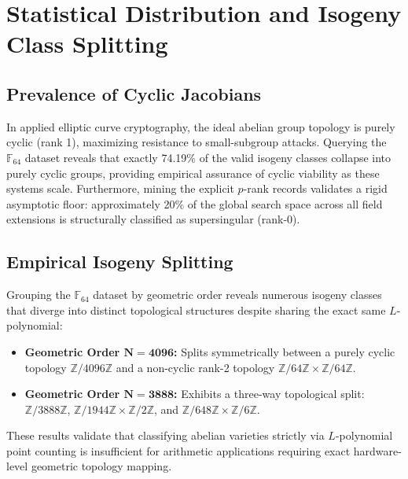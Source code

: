 \documentclass[letterpaper, 11pt]{article}
\begin{document}
	\section{Statistical Distribution and Isogeny Class Splitting}
	
	\subsection{Prevalence of Cyclic Jacobians}
	In applied elliptic curve cryptography, the ideal abelian group topology is purely cyclic (rank 1), maximizing resistance to small-subgroup attacks. Querying the $\mathbb{F}_{64}$ dataset reveals that exactly 74.19\% of the valid isogeny classes collapse into purely cyclic groups, providing empirical assurance of cyclic viability as these systems scale. Furthermore, mining the explicit $p$-rank records validates a rigid asymptotic floor: approximately 20\% of the global search space across all field extensions is structurally classified as supersingular (rank-0).
	
	\subsection{Empirical Isogeny Splitting}
	Grouping the $\mathbb{F}_{64}$ dataset by geometric order reveals numerous isogeny classes that diverge into distinct topological structures despite sharing the exact same $L$-polynomial:
	\begin{itemize}
		\item \textbf{Geometric Order $\mathbf{N=4096}$:} Splits symmetrically between a purely cyclic topology $\mathbb{Z}/4096\mathbb{Z}$ and a non-cyclic rank-2 topology $\mathbb{Z}/64\mathbb{Z} \times \mathbb{Z}/64\mathbb{Z}$.
		\item \textbf{Geometric Order $\mathbf{N=3888}$:} Exhibits a three-way topological split: $\mathbb{Z}/3888\mathbb{Z}$, $\mathbb{Z}/1944\mathbb{Z} \times \mathbb{Z}/2\mathbb{Z}$, and $\mathbb{Z}/648\mathbb{Z} \times \mathbb{Z}/6\mathbb{Z}$.
	\end{itemize}
	These results validate that classifying abelian varieties strictly via $L$-polynomial point counting is insufficient for arithmetic applications requiring exact hardware-level geometric topology mapping. 
	
\end{document}
